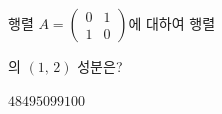 행렬 $A=\begin{pmatrix} 0 & 1 \\ 1 & 0 \end{pmatrix}$에 대하여 행렬 \par\smallskip{}\par\smallskip\noindent 의 $(1,\,2)$ 성분은?
\begin{choices32}{$48$}{$49$}{$50$}{$99$}{$100$}\end{choices32}
